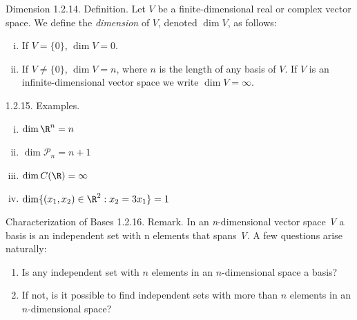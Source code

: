 \documentclass[smaller,hyperref={CJKbookmarks=true}]{beamer}
\begin{document}
\begin{frame}[c,shrink]{Dimension}
\alert{1.2.14. Definition.} Let $V$ be a finite-dimensional real or complex vector space. We define the \emph{dimension} of $V$, denoted $\dim V$, as follows:
\begin{enumerate}[(i)]
  \item If $V=\{0\}$, $\dim V=0$.
  \item If $V\neq\{0\}$, $\dim V=n$, where $n$ is the length of any basis of $V$. If $V$ is an infinite-dimensional vector space we write $\dim V=\infty$.
\end{enumerate}
\alert{1.2.15. Examples.}\\
\begin{enumerate}[(i)]
  \item $\dim \R^n=n$
  \item $\dim \mathcal{P}_n=n+1$
  \item $\dim C(\R)=\infty$
  \item $\dim\{(x_1,x_2)\in\R^2:x_2=3x_1\}=1$
\end{enumerate}
\end{frame}
\begin{frame}[c]{Characterization of Bases}
\alert{1.2.16. Remark.} In an \emph{n}-dimensional vector space \emph{V} a basis is an independent set with n elements that spans \emph{V}. A few questions arise naturally:
\begin{enumerate}[1.]
  \item Is any independent set with $n$ elements in an $n$-dimensional space a
basis?
  \item If not, is it possible to find independent sets with more than $n$ elements in an $n$-dimensional space?
\end{enumerate}
\end{frame}
\end{document}
